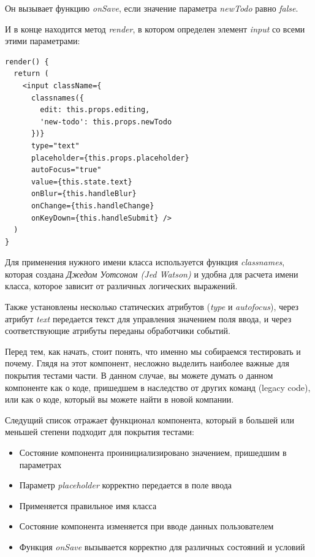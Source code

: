 Он вызывает функцию \textit{onSave}, если значение параметра \textit{newTodo} равно \textit{false}.

И в конце находится метод \textit{render}, в котором определен элемент \textit{input} со всеми этими параметрами:

\begin{lstlisting}
render() {
  return (
    <input className={
      classnames({
        edit: this.props.editing,
        'new-todo': this.props.newTodo
      })}
      type="text"
      placeholder={this.props.placeholder}
      autoFocus="true"
      value={this.state.text}
      onBlur={this.handleBlur}
      onChange={this.handleChange}
      onKeyDown={this.handleSubmit} />
  )
}
\end{lstlisting}

Для применения нужного имени класса используется функция \textit{classnames}, которая создана \textit{Джедом Уотсоном (Jed Watson)} и удобна для расчета имени класса, которое зависит от различных логических выражений.

Также установлены несколько статических атрибутов (\textit{type} и \textit{autofocus}),	 через атрибут \textit{text} передается текст для управления значением поля ввода, и через соответствующие атрибуты переданы обработчики событий.

Перед тем, как начать, стоит понять, что именно мы собираемся тестировать и почему. Глядя на этот компонент, несложно выделить наиболее важные для покрытия тестами части. В данном случае, вы можете думать о данном компоненте как о коде, пришедшем в наследство от других команд (legacy code), или как о коде, который вы можете найти в новой компании.

Следущий список отражает функционал компонента, который в большей или меньшей степени подходит для покрытия тестами:

\begin{itemize}
  \item Состояние компонента проинициализировано значением, пришедшим в параметрах
  \item Параметр \textit{placeholder} корректно передается в поле ввода
  \item Применяется правильное имя класса
  \item Состояние компонента изменяется при вводе данных пользователем
  \item Функция \textit{onSave} вызывается корректно для различных состояний и условий
\end{itemize}

